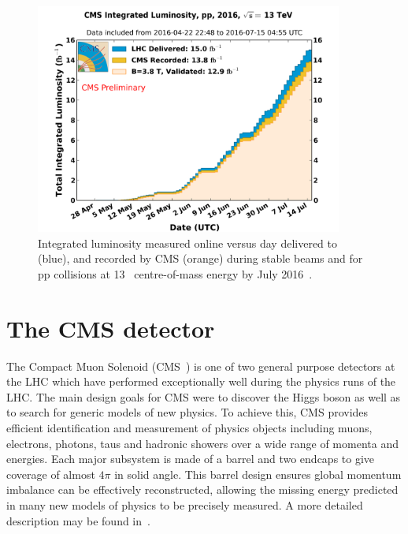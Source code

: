 \begin{figure}
\centering
    \includegraphics[width=0.9\textwidth]{./Figures/detector/int_lumi_per_day_cumulative_pp_2016_Golden_ICHEP}
  \caption{Integrated luminosity measured online versus day delivered to (blue), 
  and recorded by CMS (orange) during stable beams and for pp collisions at 13\TeV~ centre-of-mass 
  energy by July 2016~\cite{cmslumi}.}
  \label{fig:LHC-integrated-lumi}
\end{figure}

\section{The CMS detector}
The Compact Muon Solenoid (CMS~\cite{CMS}) is one of two general purpose detectors at the LHC 
which have performed exceptionally well during the physics runs of the LHC. The main design goals
for CMS were to discover the Higgs boson as well as to search for generic models 
of new physics. To achieve this, CMS provides efficient identification and measurement
of physics objects including muons, electrons, photons, taus and hadronic showers over a
wide range of momenta and energies. Each major subsystem is made of a barrel
and two endcaps to give coverage of almost $4\pi$ in solid angle. 
This barrel design ensures global momentum imbalance can be effectively 
reconstructed, allowing the missing energy predicted in many new models of physics to be
precisely measured. A more detailed description may be found in~\cite{CMS}.  

